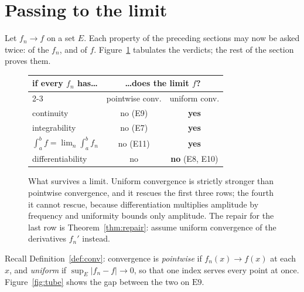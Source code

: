\section{Passing to the limit}
\label{sec:lim}

Let $f_n \to f$ on a set $E$. Each property of the preceding sections may now
be asked twice: of the $f_n$, and of $f$. Figure~\ref{fig:blockc}
tabulates the verdicts; the rest of the section proves them.

\begin{figure}[htbp]
\centering
\begin{tabular}{@{}lcc@{}}
\toprule
if every $f_n$ has\ldots & \multicolumn{2}{c}{\ldots does the limit $f$?} \\
\cmidrule(l){2-3}
 & pointwise conv. & uniform conv. \\
\midrule
continuity                          & no (E9)  & \textbf{yes} \\
integrability                       & no (E7)  & \textbf{yes} \\
$\int_a^b f = \lim_n \int_a^b f_n$  & no (E11) & \textbf{yes} \\
\addlinespace[3pt]
differentiability                   & no       & \textbf{no} (E8, E10) \\
\bottomrule
\end{tabular}
\caption{What survives a limit. Uniform convergence is strictly stronger
than pointwise convergence, and it rescues the first three rows; the fourth
it cannot rescue, because differentiation multiplies amplitude by frequency
and uniformity bounds only amplitude. The repair for the last row is
Theorem~\ref{thm:repair}: assume uniform convergence of the derivatives
$f_n'$ instead.}
\label{fig:blockc}
\end{figure}

Recall Definition~\ref{def:conv}: convergence is \emph{pointwise} if
$f_n(x)\to f(x)$ at each $x$, and \emph{uniform} if
$\sup_E|f_n-f|\to0$, so that one index serves every point at once.
Figure~\ref{fig:tube} shows the gap between the two on $\mathrm{E}9$.

